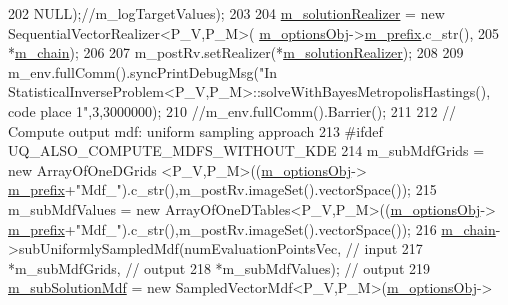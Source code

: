 \begin{DoxyCode}
202                                      NULL);\textcolor{comment}{//m\_logTargetValues);}
203 
204   \hyperlink{class_q_u_e_s_o_1_1_statistical_inverse_problem_a4ac9fdff2472ae289fcf1413d210e38e}{m\_solutionRealizer} = \textcolor{keyword}{new} SequentialVectorRealizer<P\_V,P\_M>(
      \hyperlink{class_q_u_e_s_o_1_1_statistical_inverse_problem_a481954f01d55bab4c1a36392fecb4a12}{m\_optionsObj}->\hyperlink{class_q_u_e_s_o_1_1_statistical_inverse_problem_options_ad58cf6e7350173ebea80576184a97e2b}{m\_prefix}.c\_str(),
205                                                                     *\hyperlink{class_q_u_e_s_o_1_1_statistical_inverse_problem_a5f6b98058067d21fb16981844e32910d}{m\_chain});
206 
207   m\_postRv.setRealizer(*\hyperlink{class_q_u_e_s_o_1_1_statistical_inverse_problem_a4ac9fdff2472ae289fcf1413d210e38e}{m\_solutionRealizer});
208 
209   m\_env.fullComm().syncPrintDebugMsg(\textcolor{stringliteral}{"In
       StatisticalInverseProblem<P\_V,P\_M>::solveWithBayesMetropolisHastings(), code place 1"},3,3000000);
210   \textcolor{comment}{//m\_env.fullComm().Barrier();}
211 
212   \textcolor{comment}{// Compute output mdf: uniform sampling approach}
213 \textcolor{preprocessor}{#ifdef UQ\_ALSO\_COMPUTE\_MDFS\_WITHOUT\_KDE}
214 \textcolor{preprocessor}{}  m\_subMdfGrids  = \textcolor{keyword}{new} ArrayOfOneDGrids <P\_V,P\_M>((\hyperlink{class_q_u_e_s_o_1_1_statistical_inverse_problem_a481954f01d55bab4c1a36392fecb4a12}{m\_optionsObj}->
      \hyperlink{class_q_u_e_s_o_1_1_statistical_inverse_problem_options_ad58cf6e7350173ebea80576184a97e2b}{m\_prefix}+\textcolor{stringliteral}{"Mdf\_"}).c\_str(),m\_postRv.imageSet().vectorSpace());
215   m\_subMdfValues = \textcolor{keyword}{new} ArrayOfOneDTables<P\_V,P\_M>((\hyperlink{class_q_u_e_s_o_1_1_statistical_inverse_problem_a481954f01d55bab4c1a36392fecb4a12}{m\_optionsObj}->
      \hyperlink{class_q_u_e_s_o_1_1_statistical_inverse_problem_options_ad58cf6e7350173ebea80576184a97e2b}{m\_prefix}+\textcolor{stringliteral}{"Mdf\_"}).c\_str(),m\_postRv.imageSet().vectorSpace());
216   \hyperlink{class_q_u_e_s_o_1_1_statistical_inverse_problem_a5f6b98058067d21fb16981844e32910d}{m\_chain}->subUniformlySampledMdf(numEvaluationPointsVec, \textcolor{comment}{// input}
217                                   *m\_subMdfGrids,         \textcolor{comment}{// output}
218                                   *m\_subMdfValues);       \textcolor{comment}{// output}
219   \hyperlink{class_q_u_e_s_o_1_1_statistical_inverse_problem_a4e4808280b09aa4ae0584521b78230ef}{m\_subSolutionMdf} = \textcolor{keyword}{new} SampledVectorMdf<P\_V,P\_M>(\hyperlink{class_q_u_e_s_o_1_1_statistical_inverse_problem_a481954f01d55bab4c1a36392fecb4a12}{m\_optionsObj}->

\end{DoxyCode}
